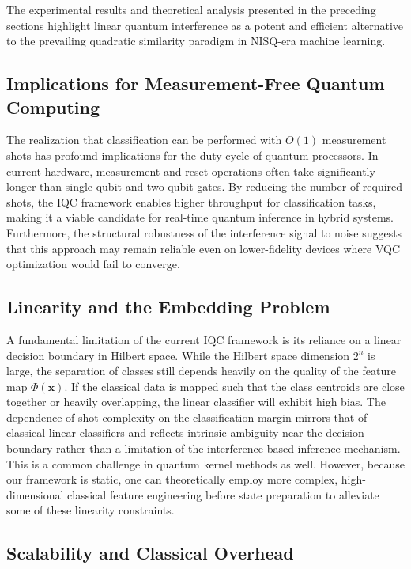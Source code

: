 \documentclass[conference]{IEEEtran}
\begin{document}
The experimental results and theoretical analysis presented in the preceding sections highlight linear quantum interference as a potent and efficient alternative to the prevailing quadratic similarity paradigm in NISQ-era machine learning.

\subsection{Implications for Measurement-Free Quantum Computing}

The realization that classification can be performed with $O(1)$ measurement shots has profound implications for the duty cycle of quantum processors. In current hardware, measurement and reset operations often take significantly longer than single-qubit and two-qubit gates. By reducing the number of required shots, the IQC framework enables higher throughput for classification tasks, making it a viable candidate for real-time quantum inference in hybrid systems. Furthermore, the structural robustness of the interference signal to noise suggests that this approach may remain reliable even on lower-fidelity devices where VQC optimization would fail to converge.

\subsection{Linearity and the Embedding Problem}

A fundamental limitation of the current IQC framework is its reliance on a linear decision boundary in Hilbert space. While the Hilbert space dimension $2^n$ is large, the separation of classes still depends heavily on the quality of the feature map $\Phi(\mathbf{x})$. If the classical data is mapped such that the class centroids are close together or heavily overlapping, the linear classifier will exhibit high bias. The dependence of shot complexity on the classification margin mirrors that of classical linear classifiers and reflects intrinsic ambiguity near the decision boundary rather than a limitation of the interference-based inference mechanism. This is a common challenge in quantum kernel methods as well. However, because our framework is static, one can theoretically employ more complex, high-dimensional classical feature engineering before state preparation to alleviate some of these linearity constraints.

\subsection{Scalability and Classical Overhead}
\end{document}
